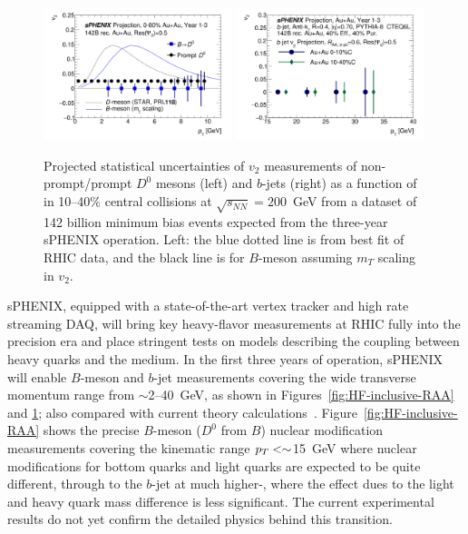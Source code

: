 \begin{figure}[htbp]
\centering
\includegraphics[width=0.49\textwidth]{figs_macro_HF/D0_BUP2020_AuAu_v2_3yr.pdf}
\includegraphics[width=0.49\textwidth]{figs/200pp_pythia8_CTEQ6L_7GeV_ALL_cfg_eneg_DSTReader_root_Draw_HFJetTruth_CrossSection2v2_3yr_EPR0_5_deta0_70.pdf}
\caption{Projected statistical uncertainties of $v_2$ measurements of
  non-prompt/prompt $D^0$ mesons (left) and $b$-jets (right) as a
  function of \pT in 10--40\% central \auau collisions at
  $\sqrt{s_{NN}}=200$~GeV from a dataset of 142 billion minimum bias
  \auau events expected from the three-year sPHENIX operation.  Left:
  the blue dotted line is from best fit of RHIC data, and the black
  line is for $B$-meson assuming $m_T$ scaling in
  $v_2$. \cite{Adamczyk:2017xur, Duke, TAMU, PHSD}}
\label{fig:HF-v2}
\end{figure}

sPHENIX, equipped with a state-of-the-art vertex tracker and high rate
streaming DAQ, will bring key heavy-flavor measurements at RHIC fully
into the precision era and place stringent tests on models describing
the coupling between heavy quarks and the medium. In the first three
years of operation, sPHENIX will enable $B$-meson and $b$-jet
measurements covering the wide transverse momentum range from
$\sim$2--40~GeV, as shown in Figures~\ref{fig:HF-inclusive-RAA} and
\ref{fig:HF-v2}; also compared with current theory
calculations~\cite{Duke,TAMU,PHSD,CUJET,Huang:2013vaa,Ke:2020nsm}.  
Figure~\ref{fig:HF-inclusive-RAA} shows the precise $B$-meson ($D^{0}$ from $B$) nuclear
modification measurements covering the kinematic range $\mbox{${p_T}$} <\sim$15~GeV where
nuclear modifications for bottom quarks and light quarks are expected
to be quite different, through to the $b$-jet at much higher-\pT,
where the effect dues to the light and heavy quark mass difference is
less significant.  The current experimental results do not yet confirm
the detailed physics behind this transition.  

